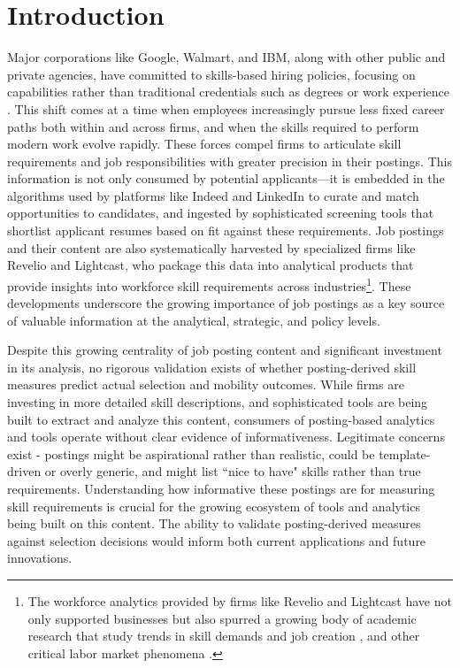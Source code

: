 
\section{Introduction}


Major corporations like Google, Walmart, and IBM, along with other public and private agencies, have committed to 
skills-based hiring policies, focusing on capabilities rather than traditional credentials such as degrees or work 
experience \citep{hbr2022skillsbased, mckinsey2020future, wef2020jobs}. This shift comes at a time when employees 
increasingly pursue less fixed career paths both within and across firms, and when the skills required to perform 
modern work evolve rapidly. These forces compel firms to articulate skill requirements and job responsibilities 
with greater precision in their postings. This information is not only consumed by potential applicants—it is 
embedded in the algorithms used by platforms like Indeed and LinkedIn to curate and match opportunities to 
candidates, and ingested by sophisticated screening tools that shortlist applicant resumes based on fit against 
these requirements. Job postings and their content are also systematically harvested by specialized firms like 
Revelio and Lightcast, who package this data into analytical products that provide insights into workforce skill 
requirements across industries\footnote{The workforce analytics provided by firms like Revelio and Lightcast have 
not only supported businesses but also spurred a growing body of academic research that study trends in skill 
demands and job creation \citep{goldfarb2020artificial, azar2020concentration}, and other critical labor market 
phenomena \citep{hershbein2018recessions, forsythe2020labor, braxton2023technological}.}. These developments 
underscore the growing importance of job postings as a key source of valuable information at the analytical, 
strategic, and policy levels.

Despite this growing centrality of job posting content and significant investment in its analysis, no rigorous validation 
exists of whether posting-derived skill measures predict actual selection and mobility outcomes. While firms are 
investing in more detailed skill descriptions, and sophisticated tools are being built to extract and analyze this content, 
consumers of posting-based analytics and tools operate without clear evidence of informativeness. Legitimate concerns 
exist - postings might be aspirational rather than realistic, could be template-driven or overly generic, and might 
list ``nice to have" skills rather than true requirements. Understanding how informative these postings are for 
measuring skill requirements is crucial for the growing ecosystem of tools and analytics being built on this content. 
The ability to validate posting-derived measures against selection decisions would inform both current applications 
and future innovations.

